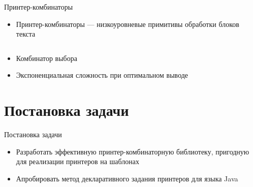 \documentclass[sans]{beamer}
\begin{document}
\begin{frame}{Принтер-комбинаторы}
  \begin{itemize}
    \item Принтер-комбинаторы --- низкоуровневые примитивы обработки блоков текста
  \end{itemize}

  \vspace{0.2cm}

  \begin{columns}
    \begin{column}{0.3\linewidth}
      \centering
    \end{column}
    
    \begin{column}{0.3\linewidth}
      \centering
    \end{column}

    \begin{column}{0.3\linewidth}
      \centering
    \end{column}
  \end{columns}

  \vspace{0.2cm}

  \begin{itemize}
    \item Комбинатор выбора
    \item Экспоненциальная сложность при оптимальном выводе
  \end{itemize}
\end{frame}

\section{Постановка задачи}

\begin{frame}{Постановка задачи}
  \begin{itemize}
    \item Разработать эффективную принтер-комбинаторную библиотеку,
      пригодную для реализации принтеров на шаблонах
      \vfill
    \item Апробировать метод декларативного задания принтеров для языка Java
  \end{itemize}
\end{frame}
\end{document}
